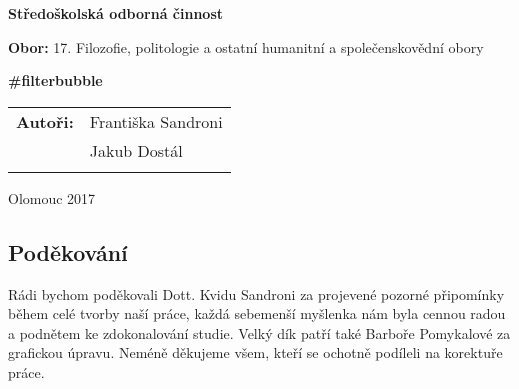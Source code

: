 \pagestyle{empty}
\begin{center}

\medskip

\vfill
{\bfseries\Large{Středoškolská odborná činnost}}

\medskip

{{\bfseries Obor: } 17. Filozofie, politologie a ostatní humanitní a společenskovědní obory}
\vfill


\vspace{20mm}

{\LARGE\bfseries \#filterbubble}

\vfill

\begin{tabular}{ll}
\bfseries Autoři: & Františka Sandroni\\
                  & Jakub Dostál\\
\noalign{\vspace{2mm}}
\end{tabular}

\vfill
Olomouc 2017
\end{center}


\newpage
\openright

\noindent
\subsection*{Poděkování}
\noindent Rádi bychom poděkovali Dott. Kvidu Sandroni za projevené pozorné připomínky během celé tvorby naší práce, každá sebemenší myšlenka nám byla cennou radou a podnětem ke zdokonalování studie. Velký dík patří také Barboře Pomykalové za grafickou úpravu. Neméně děkujeme všem, kteří se ochotně podíleli na korektuře práce.



\newpage

